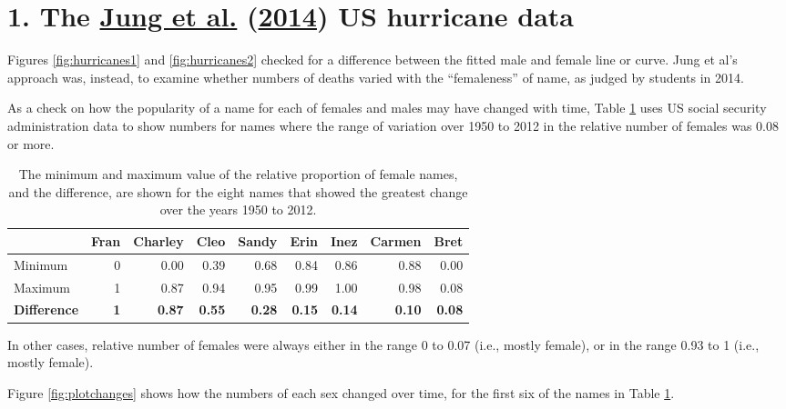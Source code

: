 \documentclass[
  10pt,
  b5paper]{book}
\begin{document}
\hypertarget{hurricanes}{%
\section*{\texorpdfstring{1. The \protect\hyperlink{ref-jung2014female}{Jung et al.} (\protect\hyperlink{ref-jung2014female}{2014}) US hurricane data}{1. The Jung et al. (2014) US hurricane data}}\label{hurricanes}}

Figures \ref{fig:hurricanes1} and \ref{fig:hurricanes2} checked
for a difference between the fitted male and female line or curve.
Jung et al's approach was, instead, to examine whether numbers of
deaths varied with the ``femaleness'' of name, as judged by students
in 2014.

As a check on how the popularity of a name for each of females
and males may have changed with time, Table \ref{tab:changetab}
uses US social security administration data to show numbers for
names where the range of variation over 1950 to 2012 in the
relative number of females was 0.08 or more.

\begin{table}

\caption{\label{tab:changetab}The minimum and maximum value of the relative proportion
of female names, and the difference, are shown for the eight names
that showed the greatest change over the years 1950 to 2012.}
\centering
\fontsize{10}{12}\selectfont
\begin{tabular}[t]{l|r|r|r|r|r|r|r|r}
\hline
  & Fran & Charley & Cleo & Sandy & Erin & Inez & Carmen & Bret\\
\hline
Minimum & 0 & 0.00 & 0.39 & 0.68 & 0.84 & 0.86 & 0.88 & 0.00\\
\hline
Maximum & 1 & 0.87 & 0.94 & 0.95 & 0.99 & 1.00 & 0.98 & 0.08\\
\hline
\textbf{Difference} & \textbf{1} & \textbf{0.87} & \textbf{0.55} & \textbf{0.28} & \textbf{0.15} & \textbf{0.14} & \textbf{0.10} & \textbf{0.08}\\
\hline
\end{tabular}
\end{table}

In other cases, relative number of females were always
either in the range 0 to 0.07 (i.e., mostly female), or
in the range 0.93 to 1 (i.e., mostly female).

Figure \ref{fig:plotchanges} shows how the numbers of
each sex changed over time, for the first six of the
names in Table \ref{tab:changetab}.
\end{document}

